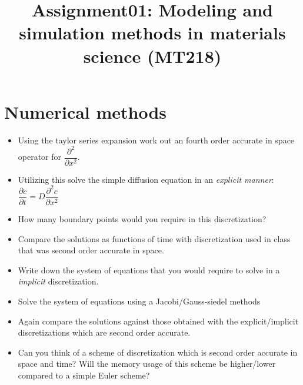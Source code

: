 \documentclass[a4paper,10pt]{article}
\title{Assignment01: Modeling and simulation methods in materials science (MT218)}
\author{}
\begin{document}
\maketitle

\section{Numerical methods}
\begin{itemize}
 \item Using the taylor series expansion work out an fourth order accurate in 
 space operator for $\dfrac{\partial ^{2}}{\partial x^{2}}$.
 \item Utilizing this solve the simple diffusion equation in an \textit{explicit manner}:
 $\dfrac{\partial c}{\partial t} = D\dfrac{\partial^{2}c}{\partial x^{2}}$
 \item How many boundary points would you require in this discretization?
 \item Compare the solutions as functions of time with discretization used 
 in class that was second order accurate in space.
 \item Write down the system of equations that you would require to solve in 
 a \textit{implicit} discretization.
 \item Solve the system of equations using a Jacobi/Gauss-siedel methods
 \item Again compare the solutions against those obtained with the explicit/implicit
 discretizations which are second order accurate.
 \item Can you think of a scheme of discretization which is second order accurate
 in space and time? Will the memory usage of this scheme be higher/lower compared
 to a simple Euler scheme?
\end{itemize}
\end{document}
